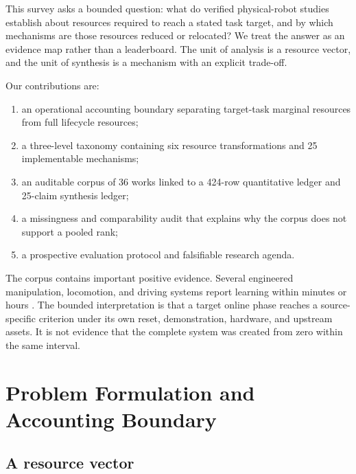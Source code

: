\documentclass[11pt]{article}
\begin{document}
This survey asks a bounded question: what do verified physical-robot studies establish about resources required to reach a stated task target, and by which mechanisms are those resources reduced or relocated? We treat the answer as an evidence map rather than a leaderboard. The unit of analysis is a resource vector, and the unit of synthesis is a mechanism with an explicit trade-off.

Our contributions are:
\begin{enumerate}
    \item an operational accounting boundary separating target-task marginal resources from full lifecycle resources;
    \item a three-level taxonomy containing six resource transformations and 25 implementable mechanisms;
    \item an auditable corpus of 36 works linked to a 424-row quantitative ledger and 25-claim synthesis ledger;
    \item a missingness and comparability audit that explains why the corpus does not support a pooled rank;
    \item a prospective evaluation protocol and falsifiable research agenda.
\end{enumerate}

The corpus contains important positive evidence. Several engineered manipulation, locomotion, and driving systems report learning within minutes or hours \cite{yang2020dataefficientlegged,wurss2023locality,stachowicz2023fastrlap,luo2024serl,zhan2022ferm,lancaster2024modemv2,liu2026autoserl}. The bounded interpretation is that a target online phase reaches a source-specific criterion under its own reset, demonstration, hardware, and upstream assets. It is not evidence that the complete system was created from zero within the same interval.

\section{Problem Formulation and Accounting Boundary}

\subsection{A resource vector}
\end{document}
